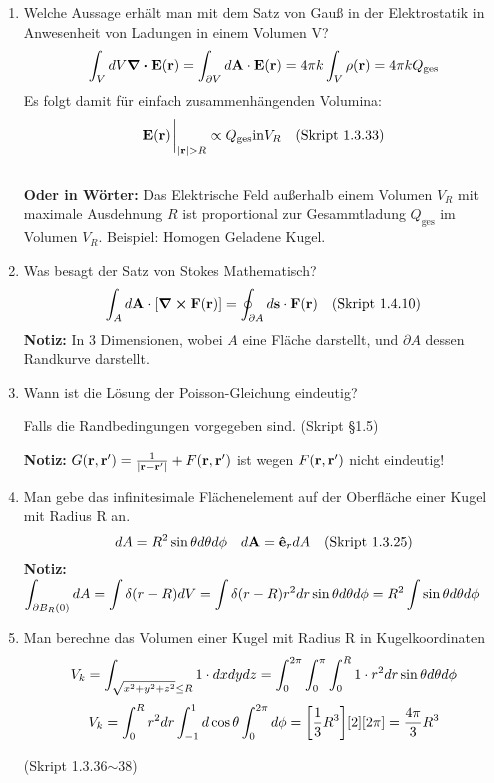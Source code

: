 \begin{enumerate}
  \item Welche Aussage erhält man mit dem Satz von Gauß in der 
        Elektrostatik in Anwesenheit von Ladungen in einem Volumen V?
        \begin{equation*}
          \int_V dV \div \vb E(\vb r) 
          = \int_{\partial V} d\vb A \cdot \vb E(\vb r) 
          = 4\pi k \int_V \rho(\vb r)
          = 4\pi k Q_{\text{ges}}
        \end{equation*}
        Es folgt damit für einfach zusammenhängenden Volumina:
        $$\vb E(\vb r)\eval_{\abs{\vb r} > R}
        \propto Q_{\text{ges}} \text{in} V_R
          \quad\text{(Skript 1.3.33)}$$\\
        \textbf{Oder in Wörter:} Das Elektrische Feld außerhalb 
        einem Volumen 
        $V_R$ mit maximale Ausdehnung $R$
        ist proportional zur Gesammtladung $Q_{\text{ges}}$ 
        im Volumen $V_R$. Beispiel: Homogen Geladene Kugel.

  \item Was besagt der Satz von Stokes Mathematisch?
        $$\displaystyle \int_A d\vb A \cdot \qty[\curl \vb F(\vb r)]=
         \oint_{\partial A}d\vb s\cdot \vb F(\vb r)
         \quad\text{(Skript 1.4.10)}$$
        \textbf{Notiz:} In 3 Dimensionen, wobei $A$ eine Fläche 
        darstellt,
        und $\partial A$ dessen Randkurve darstellt.

  \item Wann ist die Lösung der Poisson-Gleichung eindeutig?
        \begin{center}
          Falls die Randbedingungen vorgegeben sind. (Skript §1.5)
        \end{center}
        \textbf{Notiz:} $G(\vb r, \vb r')=\frac{1}{\abs{\vb{r}-\vb{r}'}} + F(\vb r, \vb r')$ 
        ist wegen $F(\vb r, \vb r')$ nicht eindeutig!
        
  \item Man gebe das infinitesimale Flächenelement auf der Oberfläche 
        einer Kugel mit Radius R an.
        $$\displaystyle dA = R^2\sin\theta d\theta d\phi
        \quad d\vb A = \vu e_r dA \quad\text{(Skript 1.3.25)}$$
        \textbf{Notiz:} $\displaystyle\int_{\partial B_R(0)} dA=\int\delta(r-R)dV
         =\int \delta(r-R)r^2dr\sin\theta d\theta d\phi
         =R^2 \int \sin\theta d\theta d\phi$

  \item Man berechne das Volumen einer Kugel mit Radius R 
        in Kugelkoordinaten\\
        $$\displaystyle V_k=\int_{\sqrt{x^2+y^2+z^2}\le R} 1\cdot dxdydz
         =\int_0^{2\pi}\int_0^\pi\int_0^R 1\cdot r^2dr 
          \sin\theta d\theta d\phi$$
        $$\displaystyle V_k=\int_0^R r^2 dr \int_{-1}^{1} d\cos\theta 
                 \int_0^{2\pi}d\phi
         =\qty[\frac{1}{3}R^3]\qty[2]\qty[2\pi]=\frac{4\pi}{3}R^3$$
        \begin{center}
          (Skript 1.3.36$\sim$38)
        \end{center}


\end{enumerate}
